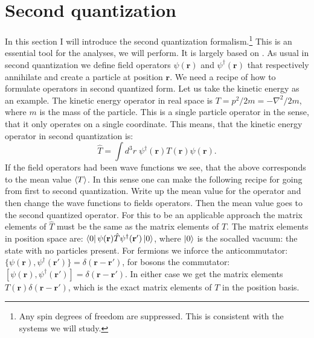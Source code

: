 \section{Second quantization} \label{sec.secondquantization}
In this section I will introduce the second quantization formalism.\footnote{Any spin degrees of freedom are suppressed. This is consistent with the systems we will study.} This is an essential tool for the analyses, we will perform. It is largely based on \cite{LandauQM}. As usual in second quantization we define field operators $\psi(\mathbf{r})$ and $\psi^\dagger(\mathbf{r})$ that respectively annihilate and create a particle at position $\mathbf{r}$. We need a recipe of how to formulate operators in second quantized form. Let us take the kinetic energy as an example. The kinetic energy operator in real space is $T = p^2/2m = -\nabla^2/2m$, where $m$ is the mass of the particle. This is a single particle operator in the sense, that it only operates on a single coordinate. This means, that the kinetic energy operator in second quantization is:
\begin{equation}
\hat{T} = \int d^3 r \; \psi^\dagger(\mathbf{r}) T(\mathbf{r})\psi(\mathbf{r}). \nonumber   
\end{equation} 
If the field operators had been wave functions we see, that the above corresponds to the mean value $\braket{T}$. In this sense one can make the following recipe for going from first to second quantization. Write up the mean value for the operator and then change the wave functions to fields operators. Then the mean value goes to the second quantized operator. For this to be an applicable approach the matrix elements of $\hat{T}$ must be the same as the matrix elements of $T$. The matrix elements in position space are: $\bra{0}\psi(\mathbf{r}) \hat{T} \psi^\dagger(\mathbf{r}')\ket{0}$, where $\ket{0}$ is the socalled vacuum: the state with no particles present. For fermions we inforce the anticommutator: $\{\psi(\mathbf{r}), \psi^\dagger(\mathbf{r}')\} = \delta(\mathbf{r}-\mathbf{r}')$, for bosons the commutator: $[\psi(\mathbf{r}), \psi^\dagger(\mathbf{r}')] = \delta(\mathbf{r}-\mathbf{r}')$. In either case we get the matrix elements $T(\mathbf{r})\delta(\mathbf{r}-\mathbf{r}')$, which is the exact matrix elements of $T$ in the position basis. 

